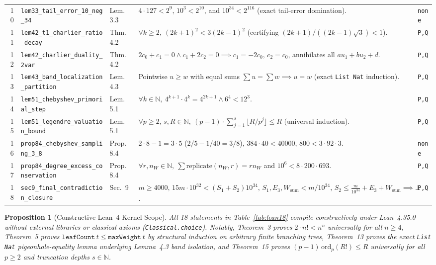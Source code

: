 \documentclass[10pt,twocolumn]{article}
\newtheorem{proposition}{Proposition}
\newcommand{\NN}{\mathbb{N}}
\begin{document}
\begin{table}[t]
\begin{tabular}{@{}r l l p{9.6cm} l@{}}
10 & \texttt{lem33\_tail\_error\_10\_neg\_34} & Lem.~3.3 & $4\cdot 127 < 2^9$, $10^3 < 2^{10}$, and $10^{34} < 2^{116}$ (exact tail-error domination). & \texttt{none} \\
11 & \texttt{lem42\_t1\_charlier\_ratio\_decay} & Thm.~4.2 & $\forall k\ge 2,\ (2k+1)^2 < 3(2k-1)^2$ (certifying $(2k+1)/((2k-1)\sqrt{3})<1$). & \texttt{P,Q} \\
12 & \texttt{lem42\_charlier\_duality\_2var} & Thm.~4.2 & $2c_0+c_1=0\wedge c_1+2c_2=0 \implies c_1=-2c_0,\,c_2=c_0$, annihilates all $a u_1+b u_2+d$. & \texttt{P,Q} \\
13 & \texttt{lem43\_band\_localization\_partition} & Lem.~4.3 & Pointwise $u\ge w$ with equal sums $\sum u = \sum w \implies u = w$ (exact \texttt{List Nat} induction). & \texttt{P,Q} \\
14 & \texttt{lem51\_chebyshev\_primorial\_step} & Lem.~5.1 & $\forall k\in\NN,\ 4^{k+1}\cdot 4^k = 4^{2k+1} \wedge 6^4 < 12^3$. & \texttt{P,Q} \\
15 & \texttt{lem51\_legendre\_valuation\_bound} & Lem.~5.1 & $\forall p\ge 2,\,s,R\in\NN,\ (p-1)\cdot\sum_{j=1}^s \lfloor R/p^j\rfloor \le R$ (universal induction). & \texttt{P,Q} \\
16 & \texttt{prop84\_chebyshev\_sampling\_3\_8} & Prop.~8.4 & $2\cdot 8 - 1 = 3\cdot 5$ ($2/5-1/40=3/8$), $384\cdot 40<40000$, $800<3\cdot 92\cdot 3$. & \texttt{none} \\
17 & \texttt{prop84\_degree\_excess\_conservation} & Prop.~8.4 & $\forall r,n_W\in\NN,\ \sum\text{replicate}(n_W,r)=r n_W$ and $10^6 < 8\cdot 200\cdot 693$. & \texttt{P,Q} \\
18 & \texttt{sec9\_final\_contradiction\_closure} & Sec.~9 & $m\ge 4000,\,15m{\cdot}10^{32}<(S_1{+}S_2)10^{34},\,S_1,E_3,W_{\mathrm{sum}}<m/10^{34},\,S_2\le\frac{m}{10^{34}}{+}E_3{+}W_{\mathrm{sum}}\implies\bot$. & \texttt{P,Q} \\
\bottomrule
\end{tabular}
\end{table}

\begin{proposition}[Constructive Lean~4 Kernel Scope]\label{prop:lean}
\normalfont All 18 statements in Table~\ref{tab:lean18} compile constructively under Lean~4.35.0 without external libraries or classical axioms (\texttt{Classical.\allowbreak choice}). Notably, Theorem~3 proves $2\cdot n!<n^n$ universally for all $n\ge 4$, Theorem~5 proves $\texttt{leafCount}\ t\le\texttt{maxWeight}\ t$ by structural induction on arbitrary finite branching trees, Theorem~13 proves the exact \texttt{List Nat} pigeonhole-equality lemma underlying Lemma~4.3 band isolation, and Theorem~15 proves $(p-1)\,\mathrm{ord}_p(R!)\le R$ universally for all $p\ge 2$ and truncation depths $s\in\NN$.
\end{proposition}
\end{document}
